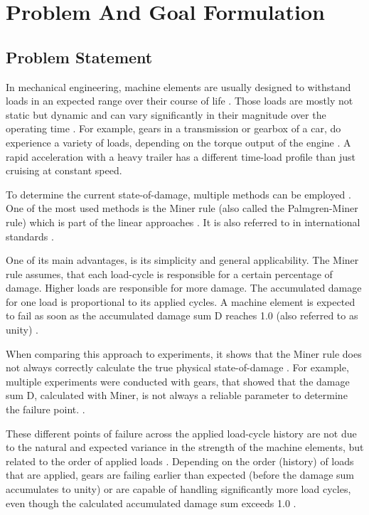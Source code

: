 \section{Problem And Goal Formulation}
\subsection{Problem Statement}\label{prob}

In mechanical engineering, machine elements are usually designed to withstand loads in an expected range over their course of life \cite{Vietze}. Those loads are mostly not static but dynamic and can vary significantly in their magnitude over the operating time \cite{Wittel}. For example, gears in a transmission or gearbox of a car, do experience a variety of loads, depending on the torque output of the engine \cite{Yuksel}. A rapid acceleration with a heavy trailer has a different time-load profile than just cruising at constant speed.

To determine the current state-of-damage, multiple methods can be employed \cite{Lee}. One of the most used methods is the Miner rule \cite{MinerOG} (also called the Palmgren-Miner rule) which is part of the linear approaches \cite{Sun}. It is also referred to in international standards \cite{ISO1}.

One of its main advantages, is its simplicity and general applicability. The Miner rule assumes, that each load-cycle is responsible for a certain percentage of damage. Higher loads are responsible for more damage. The accumulated damage for one load is proportional to its applied cycles. A machine element is expected to fail as soon as the accumulated damage sum D reaches 1.0 (also referred to as unity) \cite{ISO1, Miller}.

When comparing this approach to experiments, it shows that the Miner rule does not always correctly calculate the true physical state-of-damage \cite{Pavlou}. For example, multiple experiments were conducted with gears, that showed that the damage sum D, calculated with Miner, is not always a reliable parameter to determine the failure point. \cite{Hanumanna}.

These different points of failure across the applied load-cycle history are not due to the natural and expected variance in the strength of the machine elements, but related to the order of applied loads \cite{Skorupa}. Depending on the order (history) of loads that are applied, gears are failing earlier than expected (before the damage sum accumulates to unity) or are capable of handling significantly more load cycles, even though the calculated accumulated damage sum exceeds 1.0  \cite{Hanumanna}.

